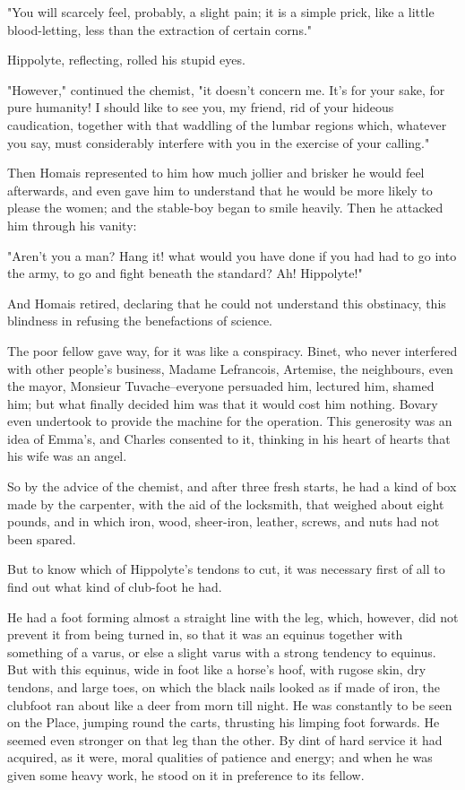 \documentclass[11pt,twocolumn]{ltugboat}
\begin{document}
"You will scarcely feel, probably, a slight pain; it is a simple prick,
like a little blood-letting, less than the extraction of certain corns."

Hippolyte, reflecting, rolled his stupid eyes.

"However," continued the chemist, "it doesn't concern me. It's for your
sake, for pure humanity! I should like to see you, my friend, rid of
your hideous caudication, together with that waddling of the lumbar
regions which, whatever you say, must considerably interfere with you in
the exercise of your calling."

Then Homais represented to him how much jollier and brisker he would
feel afterwards, and even gave him to understand that he would be more
likely to please the women; and the stable-boy began to smile heavily.
Then he attacked him through his vanity:

"Aren't you a man? Hang it! what would you have done if you had had to
go into the army, to go and fight beneath the standard? Ah! Hippolyte!"

And Homais retired, declaring that he could not understand this
obstinacy, this blindness in refusing the benefactions of science.

The poor fellow gave way, for it was like a conspiracy. Binet, who never
interfered with other people's business, Madame Lefrancois, Artemise,
the neighbours, even the mayor, Monsieur Tuvache--everyone persuaded
him, lectured him, shamed him; but what finally decided him was that it
would cost him nothing. Bovary even undertook to provide the machine
for the operation. This generosity was an idea of Emma's, and Charles
consented to it, thinking in his heart of hearts that his wife was an
angel.

So by the advice of the chemist, and after three fresh starts, he had a
kind of box made by the carpenter, with the aid of the locksmith,
that weighed about eight pounds, and in which iron, wood, sheer-iron,
leather, screws, and nuts had not been spared.

But to know which of Hippolyte's tendons to cut, it was necessary first
of all to find out what kind of club-foot he had.

He had a foot forming almost a straight line with the leg, which,
however, did not prevent it from being turned in, so that it was an
equinus together with something of a varus, or else a slight varus with
a strong tendency to equinus. But with this equinus, wide in foot like
a horse's hoof, with rugose skin, dry tendons, and large toes, on which
the black nails looked as if made of iron, the clubfoot ran about like
a deer from morn till night. He was constantly to be seen on the Place,
jumping round the carts, thrusting his limping foot forwards. He seemed
even stronger on that leg than the other. By dint of hard service it had
acquired, as it were, moral qualities of patience and energy; and
when he was given some heavy work, he stood on it in preference to its
fellow.
\end{document}
